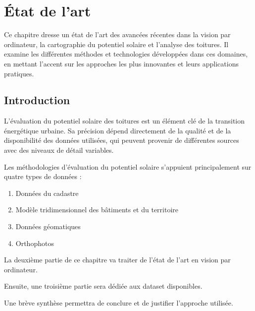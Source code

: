 
\chapter{État de l'art}
\label{chap:analysis}

Ce chapitre dresse un état de l'art des avancées récentes dans la vision par ordinateur, la cartographie du potentiel solaire et l'analyse des toitures. Il examine les différentes méthodes et technologies développées dans ces domaines, en mettant l'accent sur les approches les plus innovantes et leurs applications pratiques.

\localtableofcontents

\newpage

\section{Introduction}
\par{L'évaluation du potentiel solaire des toitures est un élément clé de la transition énergétique urbaine. Sa précision dépend directement de la qualité et de la disponibilité des données utilisées, qui peuvent provenir de différentes sources avec des niveaux de détail variables.}

\par{Les méthodologies d'évaluation du potentiel solaire s'appuient principalement sur quatre types de données :}
\begin{enumerate}
    \item Données du cadastre
    \item Modèle tridimensionnel des bâtiments et du territoire
    \item Données géomatiques
    \item Orthophotos
\end{enumerate}

\par{La deuxième partie de ce chapitre va traiter de l'état de l'art en vision par ordinateur.}

\par{Ensuite, une troisième partie sera dédiée aux dataset disponibles.}

\par{Une brève synthèse permettra de conclure et de justifier l'approche utilisée.}

